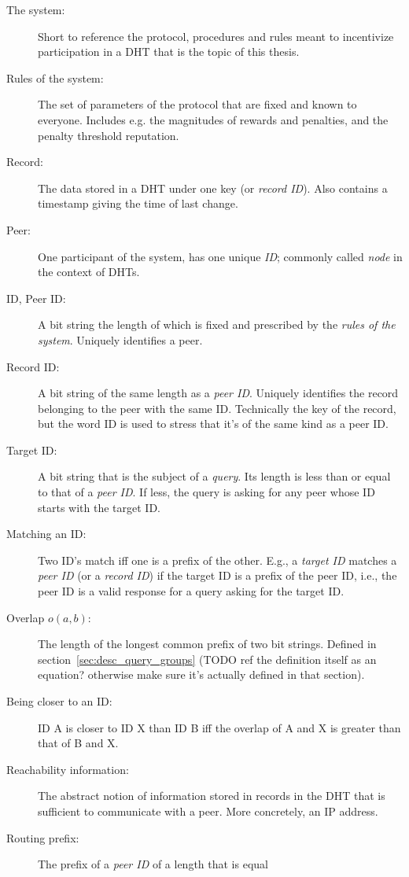 \begin{description}
\item[The system:] Short to reference the protocol, procedures and rules meant
to incentivize participation in a \ac{DHT} that is the topic of this thesis.
\item[Rules of the system:] The set of parameters of the protocol that are fixed
and known to everyone. Includes e.g. the magnitudes of rewards and penalties,
and the penalty threshold reputation.
\item[Record:] The data stored in a \ac{DHT} under one key (or \emph{record
ID}). Also contains a timestamp giving the time of last change.
\item[Peer:] One participant of the system, has one unique \emph{ID}; commonly
called \emph{node} in the context of \acp{DHT}.
\item[ID, Peer ID:] A bit string the length of which is fixed and prescribed by
the \emph{rules of the system}. Uniquely identifies a peer.
\item[Record ID:] A bit string of the same length as a \emph{peer ID}. Uniquely
identifies the record belonging to the peer with the same ID. Technically the
key of the record, but the word ID is used to stress that it's of the same kind
as a peer ID.
\item[Target ID:] A bit string that is the subject of a \emph{query}. Its length
is less than or equal to that of a \emph{peer ID}. If less, the query is asking
for any peer whose ID starts with the target ID.
\item[Matching an ID:] Two ID's match iff one is a prefix of the other. E.g., a
\emph{target ID} matches a \emph{peer ID} (or a \emph{record ID}) if the target
ID is a prefix of the peer ID, i.e., the peer ID is a valid response for a query
asking for the target ID.
\item[Overlap $o(a, b)$:] The length of the longest common prefix of two bit
strings.  Defined in section~\ref{sec:desc_query_groups} (TODO ref the
definition itself as an equation? otherwise make sure it's actually defined in
that section).
\item[Being closer to an ID:] ID A is closer to ID X than ID B iff the overlap
of A and X is greater than that of B and X.
\item[Reachability information:] The abstract notion of information stored in
records in the \ac{DHT} that is sufficient to communicate with a peer. More
concretely, an IP address.
\item[Routing prefix:] The prefix of a \emph{peer ID} of a length that is equal

\end{description}
